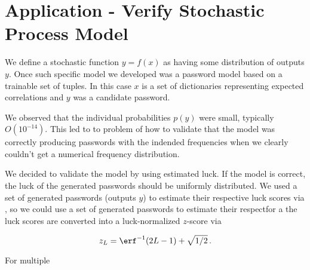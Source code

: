 \chapter{Application - Verify Stochastic Process Model}

We define a stochastic function $y=f(x)$ as having some distribution of outputs $y$.  Once such specific model we developed was a password model based on a trainable set of tuples.  In this case $x$ is a set of dictionaries representing expected correlations and $y$ was a candidate password.

We observed that the individual probabilities $p(y)$ were small, typically $O(10^{-14})$.  This led to to problem of how to validate that the model was correctly producing passwords with the indended frequencies when we clearly couldn't get a numerical frequency distribution.

We decided to validate the model by using estimated luck.  If the model is correct, the luck of the generated passwords should be uniformly distributed.  We used a set of generated passwords (outputs $y$) to estimate their respective luck scores via , so we could use a set of generated passwords to estimate their respectfor a the luck scores are converted into a luck-normalized $z$-score via

\begin{equation}
z_L = \erf^{-1}(2L-1)+\sqrt{1/2} \,.
\end{equation}

For multiple 
